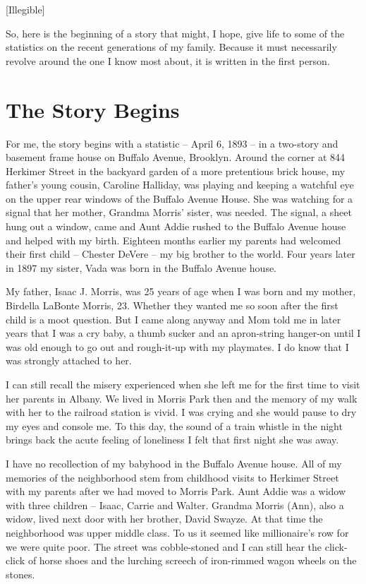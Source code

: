 \documentclass[12pt]{book}              %
\begin{document}
[Illegible]

So, here is the beginning of a story that might, I hope, give life to some of the statistics on the recent generations of my family. Because it must necessarily revolve around the one I know most about, it is written in the first person. 

\chapter{The Story Begins}

For me, the story begins with a statistic -- April 6, 1893 -- in a two-story and basement frame house on Buffalo Avenue, Brooklyn. Around the corner at 844 Herkimer Street in the backyard garden of a more pretentious brick house, my father's young cousin, Caroline Halliday, was playing and keeping a watchful eye on the upper rear windows of the Buffalo Avenue House. She was watching for a signal that her mother, Grandma Morris' sister, was needed. The signal, a sheet hung out a window, came and Aunt Addie rushed to the Buffalo Avenue house and helped with my birth. Eighteen months earlier my parents had welcomed their first child -- Chester DeVere -- my big brother to the world. Four years later in 1897 my sister, Vada was born in the Buffalo Avenue house.

My father, Isaac J. Morris, was 25 years of age when I was born and my mother, Birdella LaBonte Morris, 23. Whether they wanted me so soon after the first child is a moot question. But I came along anyway and Mom told me in later years that I was a cry baby, a thumb sucker and an apron-string hanger-on until I was old enough to go out and rough-it-up with my playmates. I do know that I was strongly attached to her. 

I can still recall the misery experienced when she left me for the first time to visit her parents in Albany. We lived in Morris Park then and the memory of my walk with her to the railroad station is vivid. I was crying and she would pause to dry my eyes and console me. To this day, the sound of a train whistle in the night brings back the acute feeling of loneliness I felt that first night she was away. 

I have no recollection of my babyhood in the Buffalo Avenue house. All of my memories of the neighborhood stem from childhood visits to Herkimer Street with my parents after we had moved to Morris Park. Aunt Addie was a widow with three children -- Isaac, Carrie and Walter. Grandma Morris (Ann), also a widow, lived next door with her brother, David Swayze. At that time the neighborhood was upper middle class. To us it seemed like millionaire's row for we were quite poor. The street was cobble-stoned and I can still hear the click-click of horse shoes and the lurching screech of iron-rimmed wagon wheels on the stones. 
\end{document}
